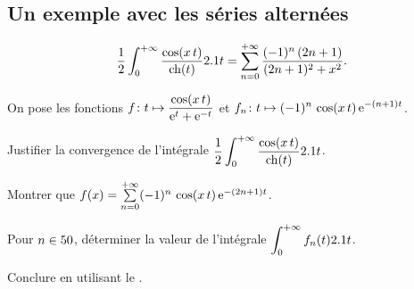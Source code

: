 \subsection{Un exemple avec les séries alternées}


\begin{prop}
\[
\frac{1}{2} \int_{0}^{+ \infty} \frac{\cos (x \, t)}{\ch(t)} \d t = \sum_{n=0}^{+ \infty} \frac{(-1)^n \, (2n+1)}{(2n+1)^2 + x^2}.
\]
\end{prop}

\begin{exercice}
On pose les fonctions $\displaystyle \fonctionligne[f]{t}{\frac{\cos(x \, t)}{\e^t + \e^{-t}}}$ et $\displaystyle \fonctionligne[f_n]{t}{(-1)^n \, \cos(x \, t) \, \e^{-(n + 1) t}}$.
\begin{questions}
\item Justifier la convergence de l'intégrale $\displaystyle\frac{1}{2} \int_{0}^{+ \infty} \frac{\cos (x \, t)}{\ch(t)} \d t$.

\item Montrer que $f(x) = \sum\limits_{n=0}^{+\infty} (-1)^n \, \cos(x \, t) \, \e^{-(2 n + 1) t}$.

\item Pour $n \in \N$, déterminer la valeur de l'intégrale $\displaystyle\int_0^{+\infty} f_n(t) \d t$.

\item Conclure en utilisant le .
\end{questions}
\end{exercice}

